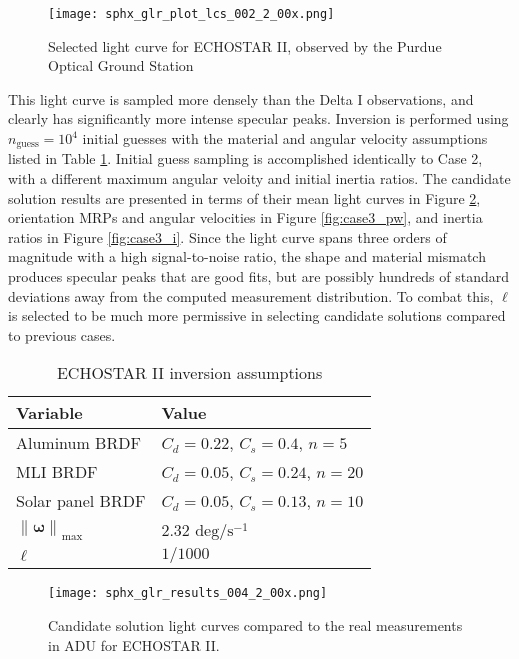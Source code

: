 \documentclass[a4paper,twocolumn]{spaceDebrisC} %
\newcommand{\vctr}[1]{\bm{#1}}
\newcommand{\norm}[1]{\left\lVert#1\right\rVert}
\newcommand{\figbig}[0]{0.5\textwidth}
\begin{document}
\begin{figure}[H]
  \centering
  \texttt{[image: sphx\_glr\_plot\_lcs\_002\_2\_00x.png]}
  \caption{Selected light curve for ECHOSTAR II, observed by the Purdue Optical Ground Station}
  \label{fig:sat_lc_obs}
\end{figure}

This light curve is sampled more densely than the Delta I observations, and clearly has significantly more intense specular peaks. Inversion is performed using $n_\text{guess}=10^4$ initial guesses with the material and angular velocity assumptions listed in Table \ref{tb:case3_ass}. Initial guess sampling is accomplished identically to Case 2, with a different maximum angular veloity and initial inertia ratios. The candidate solution results are presented in terms of their mean light curves in Figure \ref{fig:case3_s}, orientation MRPs and angular velocities in Figure \ref{fig:case3_pw}, and inertia ratios in Figure \ref{fig:case3_i}. Since the light curve spans three orders of magnitude with a high signal-to-noise ratio, the shape and material mismatch produces specular peaks that are good fits, but are possibly hundreds of standard deviations away from the computed measurement distribution. To combat this, $\ell$ is selected to be much more permissive in selecting candidate solutions compared to previous cases.

\begin{table}[H]
  \centering
  \caption{ECHOSTAR II inversion assumptions}
  \vspace*{6pt}
  \begin{tabular}{|l|l|}
  \hline
  \textbf{Variable} & \textbf{Value} \\ \hline
 Aluminum BRDF & $C_d=0.22$, $C_s=0.4$, $n=5$ \\ \hline
 MLI BRDF & $C_d=0.05$, $C_s=0.24$, $n=20$ \\ \hline
 Solar panel BRDF & $C_d=0.05$, $C_s=0.13$, $n=10$ \\ \hline
  $\norm{\vctr{\omega}}_\text{max}$ & $2.32$ $\text{deg} / \text{s}^{-1}$ \\ \hline
  $\ell$ & $1/1000$ \\ \hline
  \end{tabular}
  \label{tb:case3_ass}
\end{table}

\begin{figure}[H]
  \centering
  \texttt{[image: sphx\_glr\_results\_004\_2\_00x.png]}
  \caption{Candidate solution light curves compared to the real measurements in ADU for ECHOSTAR II.}
  \label{fig:case3_s}
\end{figure}
\end{document}
